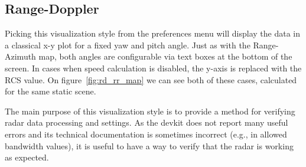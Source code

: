 \subsection{Range-Doppler}

Picking this visualization style from the preferences menu will display the data in a classical x-y plot for a fixed yaw and pitch angle.
Just as with the Range-Azimuth map, both angles are configurable via text boxes at the bottom of the screen.
In cases when speed calculation is disabled, the y-axis is replaced with the RCS value.
On figure~\ref{fig:rd_rr_map} we can see both of these cases, calculated for the same static scene.

The main purpose of this visualization style is to provide a method for verifying radar data processing and settings.
As the devkit does not report many useful errors and its technical documentation is sometimes incorrect (e.g., in allowed bandwidth values), it is useful to have a way to verify that the radar is working as expected.


